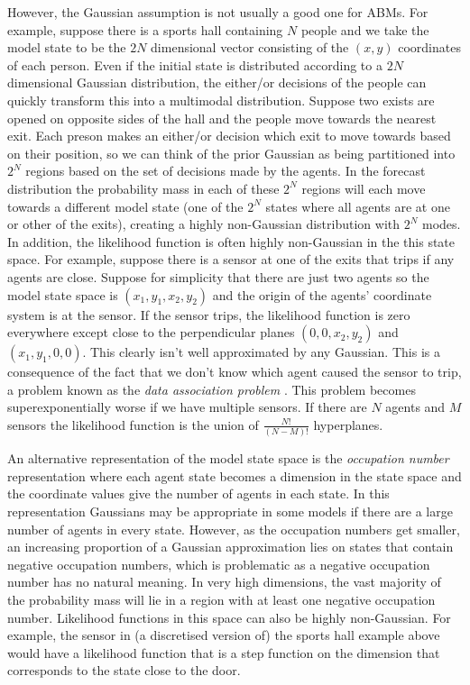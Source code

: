\documentclass{article}
\begin{document}
However, the Gaussian assumption is not usually a good one for ABMs. For example, suppose there is a sports hall containing $N$ people and we take the model state to be the $2N$ dimensional vector consisting of the $(x,y)$ coordinates of each person. Even if the initial state is distributed according to a $2N$ dimensional Gaussian distribution, the either/or decisions of the people can quickly transform this into a multimodal distribution. Suppose two exists are opened on opposite sides of the hall and the people move towards the nearest exit. Each preson makes an either/or decision which exit to move towards based on their position, so we can think of the prior Gaussian as being partitioned into $2^N$ regions based on the set of decisions made by the agents. In the forecast distribution the probability mass in each of these $2^N$ regions will each move towards a different model state (one of the $2^N$ states where all agents are at one or other of the exits), creating a highly non-Gaussian distribution with $2^N$ modes. In addition, the likelihood function is often highly non-Gaussian in the this state space. For example, suppose there is a sensor at one of the exits that trips if any agents are close. Suppose for simplicity that there are just two agents so the model state space is $(x_1,y_1,x_2,y_2)$ and the origin of the agents' coordinate system is at the sensor. If the sensor trips, the likelihood function is zero everywhere except close to the perpendicular planes $(0,0,x_2,y_2)$ and $(x_1,y_1,0,0)$. This clearly isn't well approximated by any Gaussian. This is a consequence of the fact that we don't know which agent caused the sensor to trip, a problem known as the \textit{data association problem} \citep{lueck_who_2019}. This problem becomes superexponentially worse if we have multiple sensors. If there are $N$ agents and $M$ sensors the likelihood function is the union of $\frac{N!}{(N-M)!}$ hyperplanes.

An alternative representation of the model state space is the \textit{occupation number} representation where each agent state becomes a dimension in the state space and the coordinate values give the number of agents in each state. In this representation Gaussians may be appropriate in some models if there are a large number of agents in every state. However, as the occupation numbers get smaller, an increasing proportion of a Gaussian approximation lies on states that contain negative occupation numbers, which is problematic as a negative occupation number has no natural meaning. In very high dimensions, the vast majority of the probability mass will lie in a region with at least one negative occupation number. Likelihood functions in this space can also be highly non-Gaussian. For example, the sensor in (a discretised version of) the sports hall example above would have a likelihood function that is a step function on the dimension that corresponds to the state close to the door.
\end{document}
